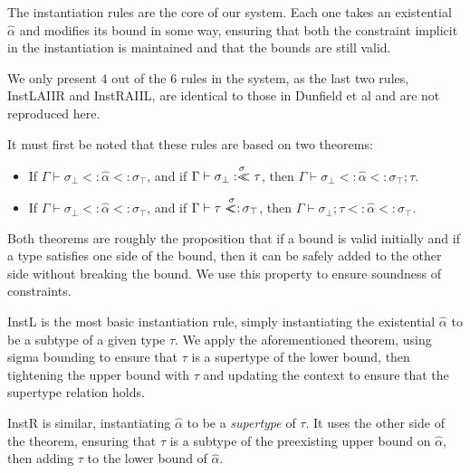 \documentclass{sig-alternate}
\newcommand{\st}{\ensuremath{\hspace{-1px}<:\hspace{-1px}}}
\newcommand{\alphahat}{\hat{\alpha}}
\newcommand{\botbound}{\sigma_\bot}
\newcommand{\topbound}{\sigma_\top}
\newcommand{\sigbndl}{\overset{\sigma}{:<\hspace{-5px}<}}
\newcommand{\sigbndr}{\overset{\sigma}{<\hspace{-5px}\st}}
\newcommand{\ctxtsep}{;}
\newcommand{\ctxbsep}{;}
\newcommand{\tst}{{\scriptstyle{<:}}}
\newcommand{\bound}[3]{#1 \tst #2 \tst #3}
\begin{document}
The instantiation rules are the core of our system. Each one takes an existential $\alphahat$ and modifies its bound in some way, ensuring that both the constraint implicit in the instantiation is maintained and that the bounds are still valid.

We only present 4 out of the 6 rules in the system, as the last two rules, InstLAIIR and InstRAIIL, are identical to those in Dunfield et al and are not reproduced here.

It must first be noted that these rules are based on two theorems: 
\begin{itemize}
\item If $\Gamma \vdash \bound{\botbound }{ \alphahat }{ \topbound}$, and if $\Gamma \vdash \botbound \sigbndl \tau$, then $\Gamma \vdash \bound{\botbound }{ \alphahat }{ \topbound \ctxtsep \tau}$.
\item If $\Gamma \vdash \bound{\botbound }{ \alphahat }{ \topbound}$, and if $\Gamma \vdash \tau \sigbndr \topbound$, then $\Gamma \vdash \bound{\botbound \ctxbsep \tau }{ \alphahat }{ \topbound}$.
\end{itemize}
Both theorems are roughly the proposition that if a bound is valid initially and if a type satisfies one side of the bound, then it can be safely added to the other side without breaking the bound. We use this property to ensure soundness of constraints.

InstL is the most basic instantiation rule, simply instantiating the existential $\alphahat$ to be a subtype of a given type $\tau$. We apply the aforementioned theorem, using sigma bounding to ensure that $\tau$ is a supertype of the lower bound, then tightening the upper bound with $\tau$ and updating the context to ensure that the supertype relation holds.

InstR is similar, instantiating $\alphahat$ to be a \emph{supertype} of $\tau$. It uses the other side of the theorem, ensuring that $\tau$ is a subtype of the preexisting upper bound on $\alphahat$, then adding $\tau$ to the lower bound of $\alphahat$.



\end{document}
